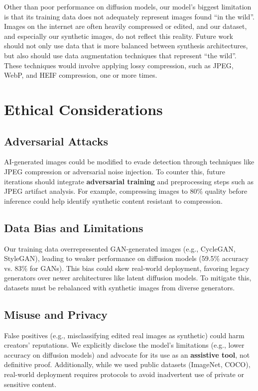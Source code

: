 \documentclass{article} %
\begin{document}
Other than poor performance on diffusion models, our model's biggest limitation is that its training data does not adequately represent images found ``in the wild''. Images on the internet are often heavily compressed or edited, and our dataset, and especially our synthetic images, do not reflect this reality. Future work should not only use data that is more balanced between synthesis architectures, but also should use data augmentation techniques that represent ``the wild''. These techniques would involve applying lossy compression, such as JPEG, WebP, and HEIF compression, one or more times.

\section{Ethical Considerations}
\subsection{Adversarial Attacks}
AI-generated images could be modified to evade detection through techniques like JPEG compression or adversarial noise injection. To counter this, future iterations should integrate \textbf{adversarial training} and preprocessing steps such as JPEG artifact analysis. For example, compressing images to 80\% quality before inference could help identify synthetic content resistant to compression.

\subsection{Data Bias and Limitations}
Our training data overrepresented GAN-generated images (e.g., CycleGAN, StyleGAN), leading to weaker performance on diffusion models (59.5\% accuracy vs. 83\% for GANs). This bias could skew real-world deployment, favoring legacy generators over newer architectures like latent diffusion models. To mitigate this, datasets must be rebalanced with synthetic images from diverse generators.

\subsection{Misuse and Privacy}
False positives (e.g., misclassifying edited real images as synthetic) could harm creators' reputations. We explicitly disclose the model’s limitations (e.g., lower accuracy on diffusion models) and advocate for its use as an \textbf{assistive tool}, not definitive proof. Additionally, while we used public datasets (ImageNet, COCO), real-world deployment requires protocols to avoid inadvertent use of private or sensitive content.
\end{document}
